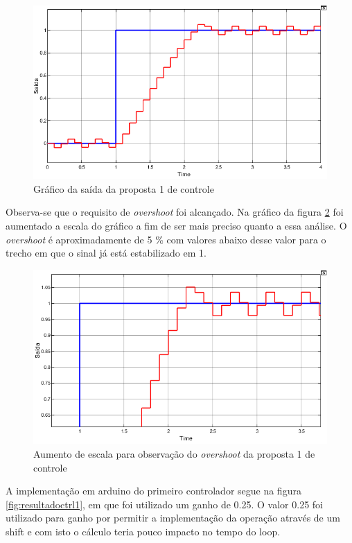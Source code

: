 \documentclass[a4paper,11pt]{article}
\begin{document}
\begin{figure}[H]
    \centering
    \includegraphics[width=\linewidth]{src/tex/img/saida_controle_1.png}
    \caption{Gráfico da saída da proposta 1 de controle}
    \label{fig:saidactrl1}
\end{figure}

Observa-se que o requisito de \textit{overshoot} foi alcançado. Na gráfico da figura \ref{fig:saidactrl1up} foi aumentado a escala do gráfico a fim de ser mais preciso quanto a essa análise. O \textit{overshoot} é aproximadamente de 5 \% com valores abaixo desse valor para o trecho em que o sinal já está estabilizado em 1.

\begin{figure}[H]
    \centering
    \includegraphics[width=\linewidth]{src/tex/img/saida_controle1_up.PNG}
    \caption{Aumento de escala para observação do \textit{overshoot} da proposta 1 de controle}
    \label{fig:saidactrl1up}
\end{figure}

A implementação em arduino do primeiro controlador segue na figura \ref{fig:resultadoctrl1}, em que foi utilizado um ganho de 0.25. O valor 0.25 foi utilizado para ganho por permitir a implementação da operação através de um shift e com isto o cálculo teria pouco impacto no tempo do loop.
\end{document}
